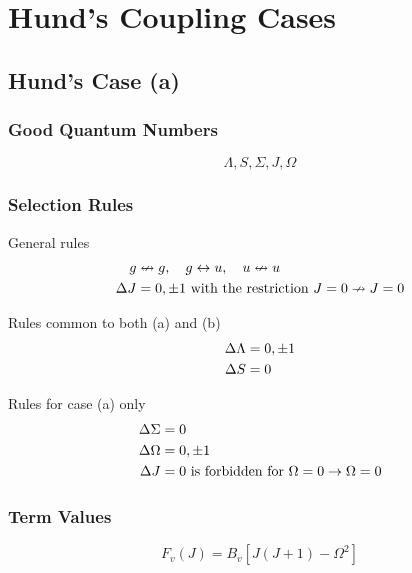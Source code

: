 \chapter{Hund's Coupling Cases}
\label{c:hunds_coupling_cases}

\section{Hund's Case (a)}
\label{s:hunds_case_a}

\subsection{Good Quantum Numbers}

\begin{equation*}
    \Lambda, S, \Sigma, J, \Omega
\end{equation*}

\subsection{Selection Rules}

General rules
\begin{align*}
    g        &\nleftrightarrow g, \quad g \leftrightarrow u, \quad u \nleftrightarrow u \\
    \adif{J} &= 0, \pm 1 \text{ with the restriction } J = 0 \nrightarrow J = 0
\end{align*}

Rules common to both (a) and (b)
\begin{align*}
    \adif{\Lambda} &= 0, \pm 1 \\
    \adif{S}       &= 0
\end{align*}

Rules for case (a) only
\begin{align*}
    \adif{\Sigma} &= 0        \\
    \adif{\Omega} &= 0, \pm 1 \\
    \adif{J}      &= 0 \text{ is forbidden for } \Omega = 0 \rightarrow \Omega = 0
\end{align*}

\subsection{Term Values}

\begin{equation*}
    F_v(J) = B_v[J(J + 1) - \Omega^2]
\end{equation*}

